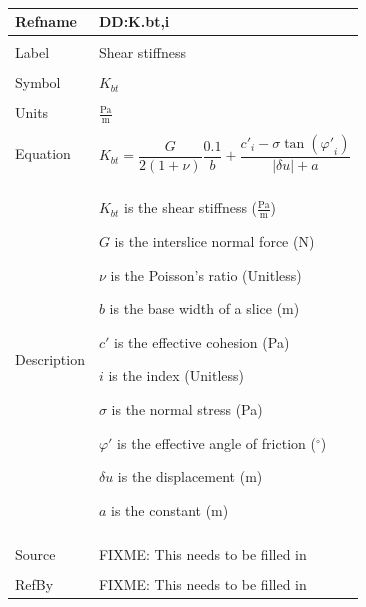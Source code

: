 \documentclass[12pt]{article}
\begin{document}
~\newline
\noindent \begin{minipage}{\textwidth}
\begin{tabular}{p{} p{}}
\toprule \textbf{Refname} & \textbf{DD:K.bt,i}
\label{DD:K.bt,i}
\\ \midrule \\
Label & Shear stiffness
\\ \midrule \\
Symbol & ${K_{bt}}$
\\ \midrule \\
Units & $\frac{\text{Pa}}{\text{m}}$
\\ \midrule \\
Equation & \begin{dmath}
           {K_{bt}}=\frac{G}{2 \left(1+ν\right)} \frac{0.1}{b}+\frac{{c'}_{i}-σ \tan\left({φ'}_{i}\right)}{|δu|+a}
           \end{dmath}
\\ \midrule \\
Description & \begin{symbDescription}
              \item{${K_{bt}}$ is the shear stiffness ($\frac{\text{Pa}}{\text{m}}$)}
              \item{$G$ is the interslice normal force (N)}
              \item{$ν$ is the Poisson's ratio (Unitless)}
              \item{$b$ is the base width of a slice (m)}
              \item{$c'$ is the effective cohesion (Pa)}
              \item{$i$ is the index (Unitless)}
              \item{$σ$ is the normal stress (Pa)}
              \item{$φ'$ is the effective angle of friction (${}^{\circ}$)}
              \item{$δu$ is the displacement (m)}
              \item{$a$ is the constant (m)}
              \end{symbDescription}
\\ \midrule \\
Source & FIXME: This needs to be filled in
\\ \midrule \\
RefBy & FIXME: This needs to be filled in
\\ \bottomrule \end{tabular}
\end{minipage}\\
\end{document}
